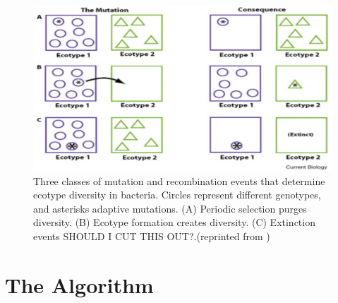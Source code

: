\begin{figure}[h!]
 \caption{Three classes of mutation and recombination events that determine ecotype diversity in bacteria. Circles represent different genotypes, and asterisks adaptive mutations. (A) Periodic selection purges diversity. (B) Ecotype formation creates diversity. (C) Extinction events SHOULD I CUT THIS OUT?.(reprinted from \protect\cite{cohan2007systematics})}
 \centering
 \label{fig:StableEvents}
 \includegraphics{images/StableEcotypeEvents-CH2}
\end{figure}


\section{The Algorithm}


